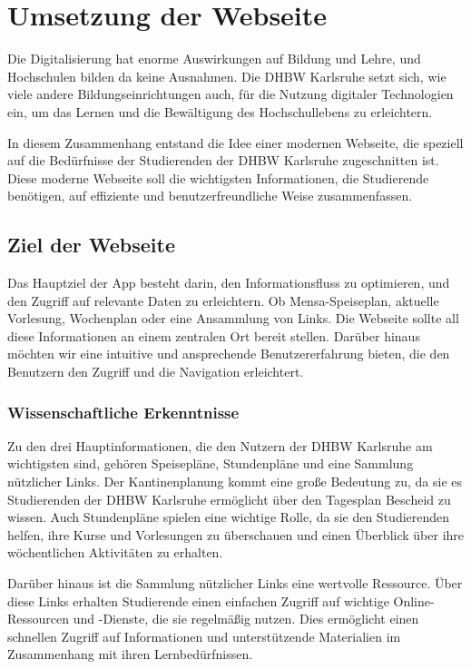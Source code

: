 \chapter{Umsetzung der Webseite}
Die Digitalisierung hat enorme Auswirkungen auf Bildung und Lehre, und Hochschulen bilden da keine Ausnahmen. Die DHBW Karlsruhe setzt sich, wie viele andere Bildungseinrichtungen auch, für die Nutzung digitaler Technologien ein, um das Lernen und die Bewältigung des Hochschullebens zu erleichtern.

In diesem Zusammenhang entstand die Idee einer modernen Webseite, die speziell auf die Bedürfnisse der Studierenden der DHBW Karlsruhe zugeschnitten ist. Diese moderne Webseite soll die wichtigsten Informationen, die Studierende benötigen, auf effiziente und benutzerfreundliche Weise zusammenfassen.

\section{Ziel der Webseite}
Das Hauptziel der App besteht darin, den Informationsfluss zu optimieren, und den Zugriff auf relevante Daten zu erleichtern. Ob Mensa-Speiseplan, aktuelle Vorlesung, Wochenplan oder eine Ansammlung von Links. Die Webseite sollte all diese Informationen an einem zentralen Ort bereit stellen. Darüber hinaus möchten wir eine intuitive und ansprechende Benutzererfahrung bieten, die den Benutzern den Zugriff und die Navigation erleichtert.
\newpage

\subsection{Wissenschaftliche Erkenntnisse} 
Zu den drei Hauptinformationen, die den Nutzern der DHBW Karlsruhe am wichtigsten sind, gehören Speisepläne, Stundenpläne und eine Sammlung nützlicher Links. Der Kantinenplanung kommt eine große Bedeutung zu, da sie es Studierenden der DHBW Karlsruhe ermöglicht über den Tagesplan Bescheid zu wissen. Auch Stundenpläne spielen eine wichtige Rolle, da sie den Studierenden helfen, ihre Kurse und Vorlesungen zu überschauen und einen Überblick über ihre wöchentlichen Aktivitäten zu erhalten.

Darüber hinaus ist die Sammlung nützlicher Links eine wertvolle Ressource. Über diese Links erhalten Studierende einen einfachen Zugriff auf wichtige Online-Ressourcen und -Dienste, die sie regelmäßig nutzen. Dies ermöglicht einen schnellen Zugriff auf Informationen und unterstützende Materialien im Zusammenhang mit ihren Lernbedürfnissen.
 
